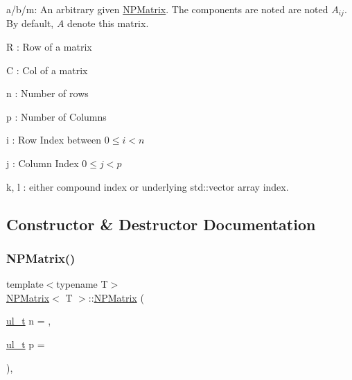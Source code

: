 \begin{DoxyItemize}
\item {\ttfamily a}/{\ttfamily b}/{\ttfamily m}\+: An arbitrary given \mbox{\hyperlink{class_n_p_matrix}{N\+P\+Matrix}}. The components are noted are noted $ A_{ij} $. By default, $ A $ denote {\ttfamily this} matrix.
\item {\ttfamily R} \+: Row of a matrix
\item {\ttfamily C} \+: Col of a matrix
\item {\ttfamily n} \+: Number of rows
\item {\ttfamily p} \+: Number of Columns
\item {\ttfamily i} \+: Row Index between $ 0 \leq i < n $
\item {\ttfamily j} \+: Column Index $ 0 \leq j < p $
\item {\ttfamily k}, {\ttfamily l} \+: either compound index or underlying {\ttfamily std\+::vector} array index. 
\end{DoxyItemize}

\subsection{Constructor \& Destructor Documentation}
\mbox{\label{class_n_p_matrix_a911b2434435553b06276977f3a86bb87}} 
\subsubsection{\texorpdfstring{NPMatrix()}{NPMatrix()}\hspace{0.1cm}{\footnotesize\ttfamily [1/7]}}
{\footnotesize\ttfamily template$<$typename T$>$ \\
\mbox{\hyperlink{class_n_p_matrix}{N\+P\+Matrix}}$<$ T $>$\+::\mbox{\hyperlink{class_n_p_matrix}{N\+P\+Matrix}} (\begin{DoxyParamCaption}\item[{\mbox{\hyperlink{typedef_8h_a1b140a2034db3f5dfe18a987745df43a}{ul\+\_\+t}}}]{n = {},  }\item[{\mbox{\hyperlink{typedef_8h_a1b140a2034db3f5dfe18a987745df43a}{ul\+\_\+t}}}]{p = {} }\end{DoxyParamCaption})\hspace{0.3cm}{\ttfamily [inline]}, {\ttfamily [explicit]}}




